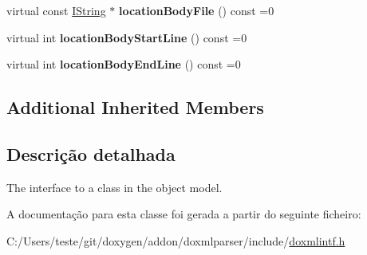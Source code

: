 \begin{DoxyCompactItemize}
\item 
\hypertarget{class_i_class_a24471e2c5b8c378f3b8d2ac94ed6f698}{virtual const \hyperlink{class_i_string}{I\-String} $\ast$ {\bfseries location\-Body\-File} () const =0}\label{class_i_class_a24471e2c5b8c378f3b8d2ac94ed6f698}

\item 
\hypertarget{class_i_class_a343f2223ac6f03570d47586987504b63}{virtual int {\bfseries location\-Body\-Start\-Line} () const =0}\label{class_i_class_a343f2223ac6f03570d47586987504b63}

\item 
\hypertarget{class_i_class_a0a92a291dc5cf7af0d319b65ff4b4811}{virtual int {\bfseries location\-Body\-End\-Line} () const =0}\label{class_i_class_a0a92a291dc5cf7af0d319b65ff4b4811}

\end{DoxyCompactItemize}
\subsection*{Additional Inherited Members}


\subsection{Descrição detalhada}
The interface to a class in the object model. 

A documentação para esta classe foi gerada a partir do seguinte ficheiro\-:\begin{DoxyCompactItemize}
\item 
C\-:/\-Users/teste/git/doxygen/addon/doxmlparser/include/\hyperlink{include_2doxmlintf_8h}{doxmlintf.\-h}\end{DoxyCompactItemize}
